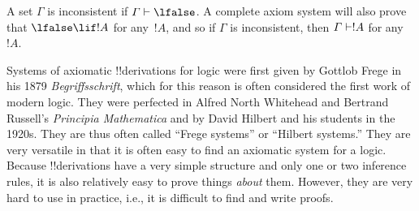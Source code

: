 \documentclass[../../../include/open-logic-section]{subfiles}
\begin{document}
A set $\Gamma$ is inconsistent if $\Gamma \Proves \lfalse$. A complete
axiom system will also prove that $\lfalse \lif !A$ for any~$!A$, and
so if $\Gamma$ is inconsistent, then $\Gamma \Proves !A$ for any~$!A$.

Systems of axiomatic !!{derivation}s for logic were first given by
Gottlob Frege in his 1879 \emph{Begriffsschrift}, which for this
reason is often considered the first work of modern logic. They were
perfected in Alfred North Whitehead and Bertrand Russell's
\emph{Principia Mathematica} and by David Hilbert and his students in
the 1920s. They are thus often called ``Frege systems'' or ``Hilbert
systems.'' They are very versatile in that it is often easy to find
an axiomatic system for a logic. Because !!{derivation}s have a very
simple structure and only one or two inference rules, it is also
relatively easy to prove things \emph{about} them. However, they are
very hard to use in practice, i.e., it is difficult to find and write
proofs.
\end{document}
